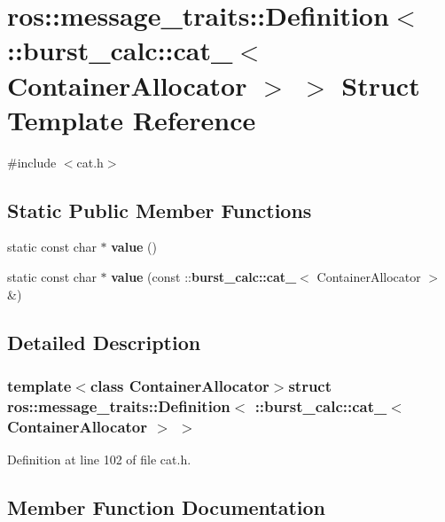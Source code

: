 \section{ros\-:\-:message\-\_\-traits\-:\-:\-Definition$<$ \-:\-:burst\-\_\-calc\-:\-:cat\-\_\-$<$ \-Container\-Allocator $>$ $>$ \-Struct \-Template \-Reference}
\label{structros_1_1message__traits_1_1Definition_3_01_1_1burst__calc_1_1cat___3_01ContainerAllocator_01_4_01_4}


{\ttfamily \#include $<$cat.\-h$>$}

\subsection*{\-Static \-Public \-Member \-Functions}
\begin{DoxyCompactItemize}
\item 
static const char $\ast$ {\bf value} ()
\item 
static const char $\ast$ {\bf value} (const \-::{\bf burst\-\_\-calc\-::cat\-\_\-}$<$ \-Container\-Allocator $>$ \&)
\end{DoxyCompactItemize}


\subsection{\-Detailed \-Description}
\subsubsection*{template$<$class Container\-Allocator$>$struct ros\-::message\-\_\-traits\-::\-Definition$<$ \-::burst\-\_\-calc\-::cat\-\_\-$<$ Container\-Allocator $>$ $>$}



\-Definition at line 102 of file cat.\-h.



\subsection{\-Member \-Function \-Documentation}
